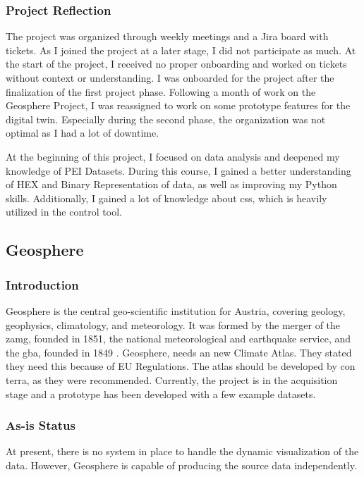\documentclass[11pt, titlepage, a4paper]{article}
\begin{document}
\subsubsection{Project Reflection}
The project was organized through weekly meetings and a Jira board with tickets. As I joined the project at a later stage, I did not participate as much. At the start of the project, I received no proper onboarding and worked on tickets without context or understanding. I was onboarded for the project after the finalization of the first project phase. Following a month of work on the Geosphere Project, I was reassigned to work on some prototype features for the digital twin. Especially during the second phase, the organization was not optimal as I had a lot of downtime.

At the beginning of this project, I focused on data analysis and deepened my knowledge of PEI Datasets. During this course, I gained a better understanding of HEX and Binary Representation of data, as well as improving my Python skills.  Additionally, I gained a lot of knowledge about \gls{css}, which is heavily utilized in the control tool.%

\subsection{Geosphere}
\subsubsection{Introduction}
Geosphere is the central geo-scientific institution for Austria, covering geology, geophysics, climatology, and meteorology.  It was formed by the merger of the \gls{zamg}, founded in 1851, the national meteorological and earthquake service, and the \gls{gba}, founded in 1849 \cite{geosphereHome2024}.
Geosphere, needs an new Climate Atlas. They stated they need this because of EU Regulations. The atlas should be developed by con terra, as they were recommended. Currently, the project is in the acquisition stage and a prototype has been developed with a few example datasets.
\subsubsection{As-is Status}
At present, there is no system in place to handle the dynamic visualization of the data. However, Geosphere is capable of producing the source data independently.
\end{document}
